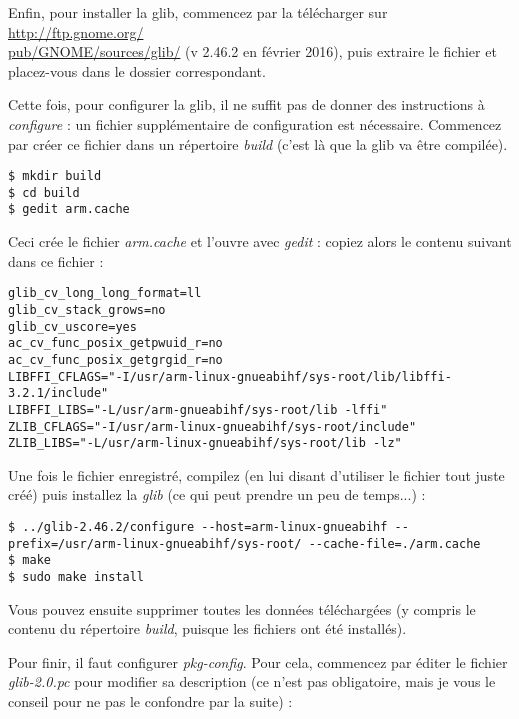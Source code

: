 \documentclass[a4paper,11pt]{article}
\begin{document}
\par Enfin, pour installer la glib, commencez par la télécharger sur \href{http://ftp.gnome.org/pub/GNOME/sources/glib/}{http://ftp.gnome.org/\\pub/GNOME/sources/glib/} (v 2.46.2 en février 2016), puis extraire le fichier et placez-vous dans le dossier correspondant.
\par Cette fois, pour configurer la glib, il ne suffit pas de donner des instructions à \emph{configure} : un fichier supplémentaire de configuration est nécessaire. Commencez par créer ce fichier dans un répertoire \emph{build} (c'est là que la glib va être compilée).

\begin{lstlisting}
$ mkdir build
$ cd build
$ gedit arm.cache
\end{lstlisting}

\par Ceci crée le fichier \emph{arm.cache} et l'ouvre avec \emph{gedit} : copiez alors le contenu suivant dans ce fichier :
\begin{lstlisting}[caption= Fichier arm.cache]
glib_cv_long_long_format=ll
glib_cv_stack_grows=no
glib_cv_uscore=yes
ac_cv_func_posix_getpwuid_r=no
ac_cv_func_posix_getgrgid_r=no
LIBFFI_CFLAGS="-I/usr/arm-linux-gnueabihf/sys-root/lib/libffi-3.2.1/include"
LIBFFI_LIBS="-L/usr/arm-gnueabihf/sys-root/lib -lffi"
ZLIB_CFLAGS="-I/usr/arm-linux-gnueabihf/sys-root/include"
ZLIB_LIBS="-L/usr/arm-linux-gnueabihf/sys-root/lib -lz"
\end{lstlisting}

\par Une fois le fichier enregistré, compilez (en lui disant d'utiliser le fichier tout juste créé) puis installez la \emph{glib} (ce qui peut prendre un peu de temps...) :

\begin{lstlisting}[]
$ ../glib-2.46.2/configure --host=arm-linux-gnueabihf --prefix=/usr/arm-linux-gnueabihf/sys-root/ --cache-file=./arm.cache
$ make
$ sudo make install
\end{lstlisting}

\par Vous pouvez ensuite supprimer toutes les données téléchargées (y compris le contenu du répertoire \emph{build}, puisque les fichiers ont été installés).\\

\par Pour finir, il faut configurer \emph{pkg-config}. Pour cela, commencez par éditer le fichier \emph{glib-2.0.pc} pour modifier sa description (ce n'est pas obligatoire, mais je vous le conseil pour ne pas le confondre par la suite) :
\end{document}

